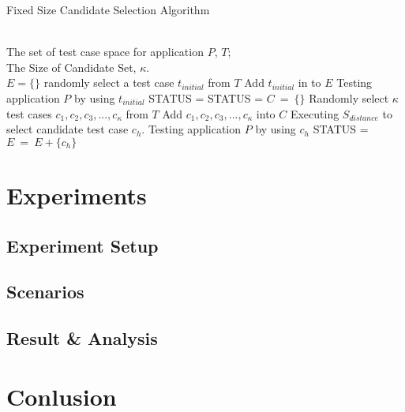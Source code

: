 \documentclass{sig-alternate}
\begin{document}
\begin{algorithm}[htb] 
\caption{ Fixed Size Candidate Selection  Algorithm  } 
\label{alg:fscs} 
\begin{algorithmic}[1] 
\REQUIRE ~~\\ 
The set of test case space for application $P$, $T$;\\
The Size of Candidate Set, $\kappa$.\bigskip\\
\STATE $E = \{\}$
\STATE randomly select a test case $t_{initial}$ from $T$
\STATE Add $t_{initial}$ in to $E$
\STATE Testing application $P$ by using $t_{initial}$
\STATE STATUS = \TRUE
\ELSE
\STATE STATUS = \FALSE
\ENDIF
{}
\STATE $C~=~\{\}$
\STATE Randomly select $\kappa$ test cases $c_{1}, c_{2}, c_{3},..., c_{\kappa}$ from $T$
\STATE Add $c_{1}, c_{2}, c_{3},..., c_{\kappa}$ into $C$
\STATE Executing $S_{distance}$ to select candidate test case $c_{h}$.
\STATE Testing application $P$ by using $c_{h}$
\STATE STATUS = \TRUE
\ELSE
\STATE $E~=~E+\{c_{h}\}$
\ENDIF
\ENDWHILE
\end{algorithmic}
\end{algorithm}

\section{Experiments}
\subsection{Experiment Setup}
\subsection{Scenarios}
\subsection{Result \& Analysis}



\section{Conlusion}
\end{document}
